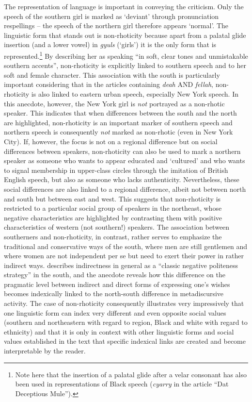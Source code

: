 The representation of language is important in conveying the criticism. Only the speech of the southern girl is marked as ‘deviant’ through pronunciation respellings – the speech of the northern girl therefore appears ‘normal’. The linguistic form that stands out is non-rhoticity because apart from a palatal glide insertion (and a lower vowel) in \emph{gyuls} (‘girls’) it is the only form that is represented.\footnote{Note here that the insertion of a palatal glide after a velar consonant has also been used in representations of Black speech (\emph{cyarry} in the article “Dat Deceptious Mule”).} By describing her as speaking “in soft, clear tones and unmistakable southern accents”, non-rhoticity is explicitly linked to southern speech and to her soft and female character. This association with the south is particularly important considering that in the articles containing \emph{deah} AND \emph{fellah}, non-rhoticity is also linked to eastern urban speech, especially New York speech. In this anecdote, however, the New York girl is \emph{not} portrayed as a non-rhotic speaker. This indicates that when differences between the south and the north are highlighted, non-rhoticity is an important marker of southern speech and northern speech is consequently \emph{not} marked as non-rhotic (even in New York City). If, however, the focus is not on a regional difference but on social differences between speakers, non-rhoticity can also be used to mark a northern speaker as someone who wants to appear educated and ‘cultured’ and who wants to signal membership in upper-class circles through the imitation of British English speech, but also as someone who lacks authenticity. Nevertheless, these social differences are also linked to a regional difference, albeit not between north and south but between east and west. This suggests that non-rhoticity is restricted to a particular social group of speakers in the northeast, whose negative characteristics are highlighted by contrasting them with positive characteristics of western (not southern!) speakers. The association between southerners and non-rhoticity, in contrast, rather serves to emphasize the traditional and conservative ways of the south, where men are still gentlemen and where women are not independent per se but need to exert their power in rather indirect ways. \citet[175]{Davies2007} describes indirectness in general as a “classic negative politeness strategy” in the south, and the anecdote reveals how this difference on the pragmatic level between indirect and direct forms of expressing one’s wishes becomes indexically linked to the north-south difference in metadiscursive activity. The case of non-rhoticity consequently illustrates very impressively that one linguistic form can index very different and even opposite social values (southern and northeastern with regard to region, Black and white with regard to ethnicity) and that it is only in context with other linguistic forms and social values established in the text that specific indexical links are created and become interpretable by the reader.


